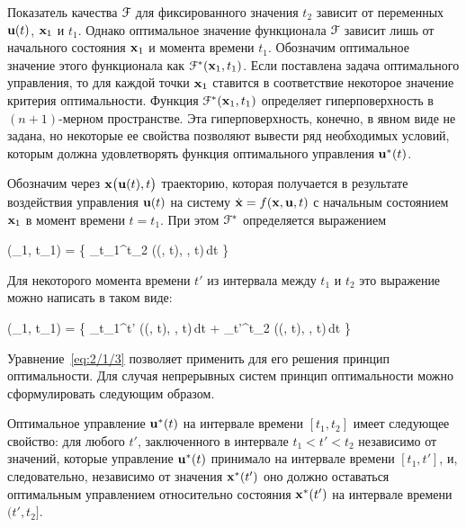Показатель качества $\mathcal{F}$ для фиксированного значения $t_2$ зависит от переменных $\mathbf{u}(t)$, $\mathbf{x}_1$ и $t_1$. Однако оптимальное значение функционала $\mathcal{F}$ зависит лишь от начального состояния $\mathbf{x}_1$ и момента времени $t_1$. Обозначим оптимальное значение этого функционала как $\mathcal{F}^{*}(\mathbf{x}_1, t_1)$. Если поставлена задача оптимального управления, то для каждой точки $\mathbf{x}_1$ ставится в соответствие некоторое значение критерия оптимальности. Функция $\mathcal{F}^{*}(\mathbf{x}_1, t_1)$ определяет гиперповерхность в $(n+1)$-мерном пространстве. Эта гиперповерхность, конечно, в явном виде не задана, но некоторые ее свойства позволяют вывести ряд необходимых условий, которым должна удовлетворять функция оптимального управления ${\mathbf{u}^{*}}(t)$.

Обозначим через $\mathbf{x} \bigl( \mathbf{u}(t), t \bigr)$ траекторию, которая получается в результате воздействия управления $\mathbf{u}(t)$ на систему $\dot{\mathbf{x}} = f(\mathbf{x}, \mathbf{u}, t)$ с начальным состоянием $\mathbf{x}_1$ в момент времени $t = t_1$. При этом $\mathcal{F}^{*}$ определяется выражением

    \optF(_1, t_1) =  \biggl\{ \int\limits_{t_1}^{t_2} \funcL\bigl((, t), , t\bigr)\,dt \biggr\} 
\eeq

Для некоторого момента времени $t'$ из интервала между $t_1$ и $t_2$ это выражение можно написать в таком виде:

    \optF(_1, t_1) =  \biggl\{ \int\limits_{t_1}^{t'} \funcL\bigl((, t), , t\bigr)\,dt + \int\limits_{t'}^{t_2} \funcL\bigl((, t), , t\bigr)\,dt \biggr\} 
\eeq

Уравнение~\ref{eq:2/1/3} позволяет применить для его решения принцип оптимальности. Для случая непрерывных систем принцип оптимальности можно сформулировать следующим образом.

\begin{statement}
    Оптимальное управление ${\mathbf{u}^{*}}(t)$ на интервале времени $[t_1, t_2]$ имеет следующее свойство: для любого $t'$, заключенного в интервале $t_1 < t' < t_2$ независимо от значений, которые управление ${\mathbf{u}^{*}}(t)$ принимало на интервале времени $[t_1, t']$, и, следовательно, независимо от значения ${\mathbf{x}^{*}}(t')$ оно должно оставаться оптимальным управлением относительно состояния ${\mathbf{x}^{*}}(t')$ на интервале времени $(t', t_2]$.
\end{statement}

